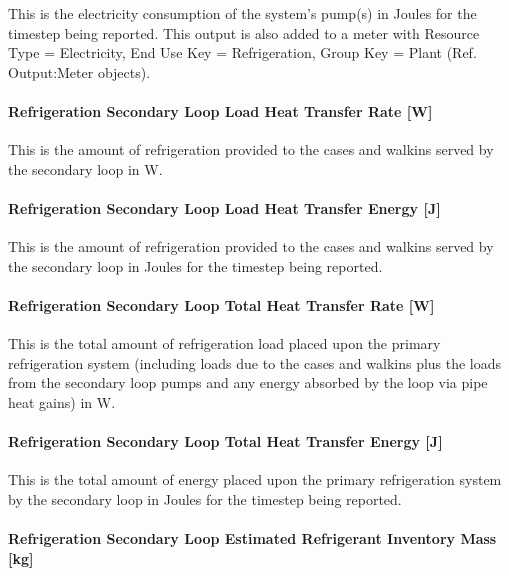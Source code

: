 This is the electricity consumption of the system's pump(s) in Joules for the timestep being reported. This output is also added to a meter with Resource Type = Electricity, End Use Key = Refrigeration, Group Key = Plant (Ref. Output:Meter objects).

\paragraph{Refrigeration Secondary Loop Load Heat Transfer Rate {[}W{]}}\label{refrigeration-secondary-loop-load-heat-transfer-rate-w}

This is the amount of refrigeration provided to the cases and walkins served by the secondary loop in W.

\paragraph{Refrigeration Secondary Loop Load Heat Transfer Energy {[}J{]}}\label{refrigeration-secondary-loop-load-heat-transfer-energy-j}

This is the amount of refrigeration provided to the cases and walkins served by the secondary loop in Joules for the timestep being reported.

\paragraph{Refrigeration Secondary Loop Total Heat Transfer Rate {[}W{]}}\label{refrigeration-secondary-loop-total-heat-transfer-rate-w}

This is the total amount of refrigeration load placed upon the primary refrigeration system (including loads due to the cases and walkins plus the loads from the secondary loop pumps and any energy absorbed by the loop via pipe heat gains) in W.

\paragraph{Refrigeration Secondary Loop Total Heat Transfer Energy {[}J{]}}\label{refrigeration-secondary-loop-total-heat-transfer-energy-j}

This is the total amount of energy placed upon the primary refrigeration system by the secondary loop in Joules for the timestep being reported.

\paragraph{Refrigeration Secondary Loop Estimated Refrigerant Inventory Mass {[}kg{]}}\label{refrigeration-secondary-loop-estimated-refrigerant-inventory-mass-kg}

